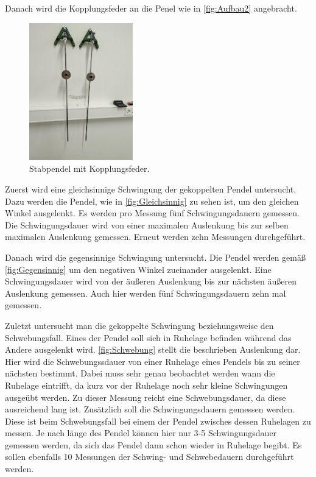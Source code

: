Danach wird die Kopplungsfeder an die Penel wie in \autoref{fig:Aufbau2} angebracht. 
\begin{figure}
    \centering
    \includegraphics[width=0.4\textwidth]{content/Gekoppelt.jpg}
	\caption{Stabpendel mit Kopplungsfeder.}
	\label{fig:Aufbau2}
\end{figure}
Zuerst wird eine gleichsinnige Schwingung der gekoppelten Pendel untersucht. Dazu werden die Pendel, wie in \autoref{fig:Gleichsinnig} zu sehen ist, um den gleichen Winkel ausgelenkt.
Es werden pro Messung fünf Schwingungsdauern gemessen. Die Schwingungsdauer wird von einer maximalen Auslenkung bis zur selben maximalen Auslenkung gemessen. Erneut werden zehn
Messungen durchgeführt. 


Danach wird die gegensinnige Schwingung untersucht. Die Pendel werden gemäß \autoref{fig:Gegensinnig} um den negativen Winkel zueinander ausgelenkt. Eine Schwingungsdauer wird von
der äußeren Auslenkung bis zur nächsten äußeren Auslenkung gemessen. Auch hier werden fünf Schwingungsdauern zehn mal gemessen. 


Zuletzt untersucht man die gekoppelte Schwingung beziehungsweise den Schwebungsfall. Eines der Pendel soll sich in Ruhelage befinden während das Andere ausgelenkt wird. 
\autoref{fig:Schwebung} stellt die beschrieben Auslenkung dar. Hier wird die Schwebungssdauer von einer Ruhelage eines Pendels bis zu seiner nächsten bestimmt. Dabei muss sehr
genau beobachtet werden wann die Ruhelage eintrifft, da kurz vor der Ruhelage noch sehr kleine Schwingungen ausgeübt werden. Zu dieser Messung reicht eine Schwebungsdauer, da diese
ausreichend lang ist. Zusätzlich soll die Schwingungsdauern gemessen werden. Diese ist beim Schwebungsfall bei einem der Pendel zwisches dessen Ruhelagen zu messen. Je nach länge 
des Pendel können hier nur 3-5 Schwingungsdauer gemessen werden, da sich das Pendel dann schon wieder in Ruhelage begibt. Es sollen ebenfalls 10 Messungen der Schwing- und Schwebedauern
durchgeführt werden. 